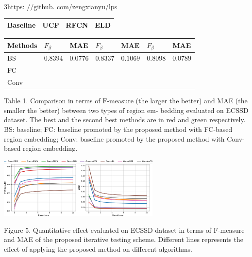 \documentclass[a4paper,10pt]{article}
\begin{document}
3https: $//$github. com/zengxianyu/lps
\begin{center}
\begin{tabular}{|l|l|l|l|}
\hline
\multicolumn{1}{|l|}{Baseline}&	\multicolumn{1}{|l|}{UCF}&	\multicolumn{1}{|l|}{RFCN}&	\multicolumn{1}{|l|}{ELD}	\\
\hline
\end{tabular}


\begin{tabular}{|l|l|l|l|l|l|l|}
\hline
\multicolumn{1}{|l|}{Methods}&	\multicolumn{1}{|l|}{$F_{\beta}$}&	\multicolumn{1}{|l|}{MAE}&	\multicolumn{1}{|l|}{$F_{\beta}$}&	\multicolumn{1}{|l|}{MAE}&	\multicolumn{1}{|l|}{$F_{\beta}$}&	\multicolumn{1}{|l|}{MAE}	\\
\hline
\multicolumn{1}{|l|}{BS}&	\multicolumn{1}{|l|}{$0.8394$}&	\multicolumn{1}{|l|}{ $0.0776$}&	\multicolumn{1}{|l|}{ $0.8337$}&	\multicolumn{1}{|l|}{ $0.1069$}&	\multicolumn{1}{|l|}{ $0.8098$}&	\multicolumn{1}{|l|}{ $0.0789$}	\\
\hline
\multicolumn{1}{|l|}{FC}&	\multicolumn{1}{|l|}{}&	\multicolumn{1}{|l|}{}&	\multicolumn{1}{|l|}{}&	\multicolumn{1}{|l|}{}&	\multicolumn{1}{|l|}{}&	\multicolumn{1}{|l|}{}	\\
\hline
\multicolumn{1}{|l|}{Conv}&	\multicolumn{1}{|l|}{}&	\multicolumn{1}{|l|}{}&	\multicolumn{1}{|l|}{}&	\multicolumn{1}{|l|}{}&	\multicolumn{1}{|l|}{}&	\multicolumn{1}{|l|}{}	\\
\hline
\end{tabular}

\end{center}
Table 1. Comparison in terms of $\mathrm{F}$-measure (the larger the better) and MAE (the smaller the better) between two types of region em- bedding evaluated on ECSSD dataset. The best and the second best methods are in red and green respectively. BS: baseline; FC: baseline promoted by the proposed method with FC-based region embedding; Conv: baseline promoted by the proposed method with Conv-based region embedding.
\begin{center}
\includegraphics[width=80.94mm,height=30.82mm]{./zengyu_images/image010.eps}
\end{center}
Figure 5. Quantitative effect evaluated on ECSSD dataset in terms of $\mathrm{F}$-measure and MAE of the proposed iterative testing scheme. Different lines represents the effect of applying the proposed method on different algorithms.
\end{document}
